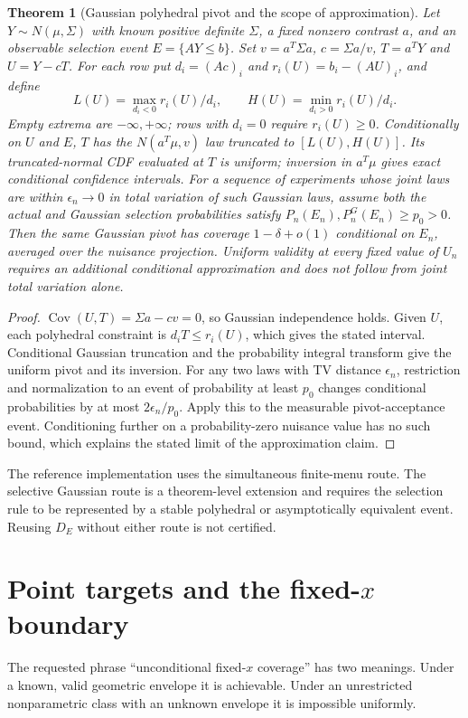 \documentclass[11pt,a4paper]{article}
\numberwithin{equation}{section}
\newtheorem{theorem}{Theorem}[section]
\theoremstyle{definition}\newtheorem{definition}[theorem]{Definition}
\theoremstyle{remark}\newtheorem{remark}[theorem]{Remark}
\begin{document}
\begin{theorem}[Gaussian polyhedral pivot and the scope of approximation]\label{thm:polyselect}
Let $Y\sim N(\mu,\Sigma)$ with known positive definite $\Sigma$, a fixed
nonzero contrast $a$, and an observable selection event $E=\{AY\le b\}$.
Set $v=a^T\Sigma a$, $c=\Sigma a/v$, $T=a^TY$ and $U=Y-cT$.
For each row put $d_i=(Ac)_i$ and $r_i(U)=b_i-(AU)_i$, and define
\[
 L(U)=\max_{d_i<0}r_i(U)/d_i,\qquad
 H(U)=\min_{d_i>0}r_i(U)/d_i.
\]
Empty extrema are $-\infty,+\infty$; rows with $d_i=0$ require $r_i(U)\ge0$.
Conditionally on $U$ and $E$, $T$ has the $N(a^T\mu,v)$ law truncated to
$[L(U),H(U)]$. Its truncated-normal CDF evaluated at $T$ is uniform; inversion
in $a^T\mu$ gives exact conditional confidence intervals.
For a sequence of experiments whose joint laws are within $\epsilon_n\to0$
in total variation of such Gaussian laws, assume both the actual and Gaussian
selection probabilities satisfy $P_n(E_n),P_n^{G}(E_n)\ge p_0>0$. Then the same Gaussian pivot
has coverage $1-\delta+o(1)$ conditional on $E_n$, averaged
over the nuisance projection. Uniform validity at every fixed value of $U_n$
requires an additional conditional approximation and does not follow from
joint total variation alone.
\end{theorem}
\begin{proof}
$\operatorname{Cov}(U,T)=\Sigma a-cv=0$, so Gaussian independence holds.
Given $U$, each polyhedral constraint is $d_iT\le r_i(U)$, which gives the
stated interval. Conditional Gaussian truncation and the probability integral
transform give the uniform pivot and its inversion. For any two laws with
TV distance $\epsilon_n$, restriction and normalization to an event of
probability at least $p_0$ changes conditional probabilities by at most
$2\epsilon_n/p_0$. Apply this to the measurable pivot-acceptance event.
Conditioning further on a probability-zero nuisance value has no such bound,
which explains the stated limit of the approximation claim.
\end{proof}

The reference implementation uses the simultaneous finite-menu route. The selective Gaussian route is a theorem-level extension and requires the selection rule to be represented by a stable polyhedral or asymptotically equivalent event. Reusing $D_E$ without either route is not certified.

\section{Point targets and the fixed-\texorpdfstring{$x$}{x} boundary}\label{sec:fixedx}
The requested phrase “unconditional fixed-\(x\) coverage” has two meanings. Under a known, valid geometric envelope it is achievable. Under an unrestricted nonparametric class with an unknown envelope it is impossible uniformly.
\end{document}
